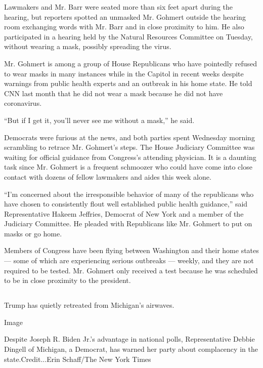 Lawmakers and Mr. Barr were seated more than six feet apart during the
hearing, but reporters spotted an unmasked Mr. Gohmert outside the
hearing room exchanging words with Mr. Barr and in close proximity to
him. He also participated in a hearing held by the Natural Resources
Committee on Tuesday, without wearing a mask, possibly spreading the
virus.

Mr. Gohmert is among a group of House Republicans who have pointedly
refused to wear masks in many instances while in the Capitol in recent
weeks despite warnings from public health experts and an outbreak in his
home state. He told CNN last month that he did not wear a mask because
he did not have coronavirus.

``But if I get it, you'll never see me without a mask,'' he said.

Democrats were furious at the news, and both parties spent Wednesday
morning scrambling to retrace Mr. Gohmert's steps. The House Judiciary
Committee was waiting for official guidance from Congress's attending
physician. It is a daunting task since Mr. Gohmert is a frequent
schmoozer who could have come into close contact with dozens of fellow
lawmakers and aides this week alone.

``I'm concerned about the irresponsible behavior of many of the
republicans who have chosen to consistently flout well established
public health guidance,'' said Representative Hakeem Jeffries, Democrat
of New York and a member of the Judiciary Committee. He pleaded with
Republicans like Mr. Gohmert to put on masks or go home.

Members of Congress have been flying between Washington and their home
states --- some of which are experiencing serious outbreaks --- weekly,
and they are not required to be tested. Mr. Gohmert only received a test
because he was scheduled to be in close proximity to the president.

\hypertarget{-5}{%
\subsection{}\label{-5}}

Trump has quietly retreated from Michigan's airwaves.

Image

Despite Joseph R. Biden Jr.'s advantage in national polls,
Representative Debbie Dingell of Michigan, a Democrat, has warned her
party about complacency in the state.Credit...Erin Schaff/The New York
Times


